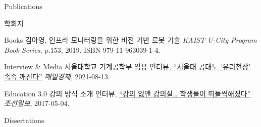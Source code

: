 \begin{rSection}{Publications}
{\begin{pubSubsectionNum}{학회지}
  \end{pubSubsectionNum}

  \begin{pubSubsectionNum}{Books}
    김아영,
    인프라 모니터링을 위한 비전 기반 로봇 기술
    \textit{KAIST U-City Program Book Series}, p.153, 2019. ISBN 979-11-963039-1-4.

  \end{pubSubsectionNum}

  \begin{pubSubsectionNum}{Interview \& Media}
    서울대학교 기계공학부 임용 인터뷰,
    \hyperlink{https://www.mk.co.kr/news/society/view/2021/08/787393/}{``서울대 공대도 `유리천장' 속속 깨진다''}
    \textit{매일경제}, 2021-08-13.

    Education 3.0 강의 방식 소개 인터뷰,
    \hyperlink{http://news.chosun.com/site/data/html_dir/2017/05/04/2017050400133.html}{``강의 없앤 강의실… 학생들이 떠들썩해졌다''}
    \textit{조선일보}, 2017-05-04.

  \end{pubSubsectionNum}
}

\begin{pubSubsectionNum}{Dissertations}
  \item {}
  \item {}
\end{pubSubsectionNum}


\end{rSection}
